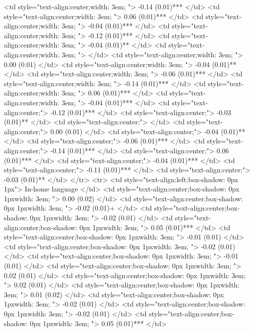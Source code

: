    <td style="text-align:center;width: 3em; "> -0.14 (0.01)*** </td>
   <td style="text-align:center;width: 3em; "> 0.06 (0.01)*** </td>
   <td style="text-align:center;width: 3em; "> -0.04 (0.01)*** </td>
   <td style="text-align:center;width: 3em; "> -0.12 (0.01)*** </td>
   <td style="text-align:center;width: 3em; "> -0.04 (0.01)** </td>
   <td style="text-align:center;width: 3em; ">  </td>
   <td style="text-align:center;width: 3em; "> 0.00 (0.01) </td>
   <td style="text-align:center;width: 3em; "> -0.04 (0.01)** </td>
   <td style="text-align:center;width: 3em; "> -0.06 (0.01)*** </td>
   <td style="text-align:center;width: 3em; "> -0.14 (0.01)*** </td>
   <td style="text-align:center;width: 3em; "> 0.06 (0.01)*** </td>
   <td style="text-align:center;width: 3em; "> -0.04 (0.01)*** </td>
   <td style="text-align:center;"> -0.12 (0.01)*** </td>
   <td style="text-align:center;"> -0.03 (0.01)** </td>
   <td style="text-align:center;">  </td>
   <td style="text-align:center;"> 0.00 (0.01) </td>
   <td style="text-align:center;"> -0.04 (0.01)** </td>
   <td style="text-align:center;"> -0.06 (0.01)*** </td>
   <td style="text-align:center;"> -0.14 (0.01)*** </td>
   <td style="text-align:center;"> 0.06 (0.01)*** </td>
   <td style="text-align:center;"> -0.04 (0.01)*** </td>
   <td style="text-align:center;"> -0.11 (0.01)*** </td>
   <td style="text-align:center;"> -0.03 (0.01)** </td>
  </tr>
  <tr>
   <td style="text-align:left;box-shadow: 0px 1px"> In-home language </td>
   <td style="text-align:center;box-shadow: 0px 1pxwidth: 3em; "> 0.00 (0.02) </td>
   <td style="text-align:center;box-shadow: 0px 1pxwidth: 3em; "> -0.02 (0.01)+ </td>
   <td style="text-align:center;box-shadow: 0px 1pxwidth: 3em; "> -0.02 (0.01) </td>
   <td style="text-align:center;box-shadow: 0px 1pxwidth: 3em; "> 0.05 (0.01)*** </td>
   <td style="text-align:center;box-shadow: 0px 1pxwidth: 3em; "> -0.01 (0.01) </td>
   <td style="text-align:center;box-shadow: 0px 1pxwidth: 3em; "> -0.02 (0.01) </td>
   <td style="text-align:center;box-shadow: 0px 1pxwidth: 3em; "> -0.01 (0.01) </td>
   <td style="text-align:center;box-shadow: 0px 1pxwidth: 3em; "> 0.02 (0.01) </td>
   <td style="text-align:center;box-shadow: 0px 1pxwidth: 3em; "> 0.02 (0.01) </td>
   <td style="text-align:center;box-shadow: 0px 1pxwidth: 3em; "> 0.01 (0.02) </td>
   <td style="text-align:center;box-shadow: 0px 1pxwidth: 3em; "> -0.02 (0.01) </td>
   <td style="text-align:center;box-shadow: 0px 1pxwidth: 3em; "> -0.02 (0.01) </td>
   <td style="text-align:center;box-shadow: 0px 1pxwidth: 3em; "> 0.05 (0.01)*** </td>
